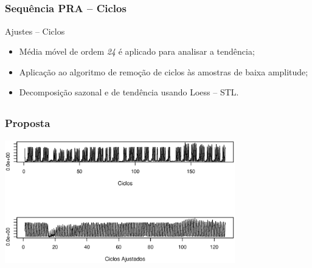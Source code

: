 \documentclass[aspectratio=169]{beamer}
\begin{document}
\subsection{}
\begin{frame}
\frametitle{Sequência PRA -- Ciclos}
\vspace{-0.1cm}
\vspace{-0.1cm}
 \begin{block}{Ajustes -- Ciclos}
        \begin{itemize}[triangle]
            \item Média móvel de ordem \emph{24} é aplicado para analisar a tendência;
            \item Aplicação ao algoritmo de remoção de ciclos às amostras de baixa amplitude;
            \item Decomposição sazonal e de tendência usando Loess -- STL.
        \end{itemize}
        \end{block}
\end{frame}




\subsection{}
\begin{frame}
\frametitle{Proposta}

        \centering
\includegraphics[width=0.75\textwidth,angle=0]{cicloOrig_Ajustado.eps}
\end{frame}
\end{document}
